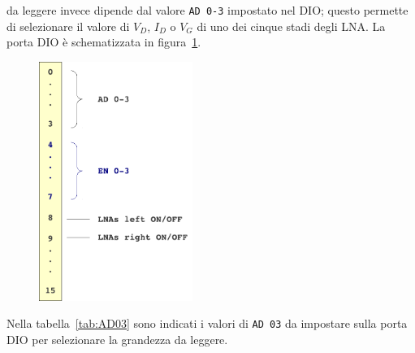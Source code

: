 da leggere invece dipende dal valore \texttt{AD 0-3} impostato nel DIO; questo permette di selezionare il valore di
$V_D$, $I_D$ o $V_G$ di uno dei cinque stadi degli LNA. La porta DIO \`e schematizzata in figura~\ref{fig:DIO}.
\begin{center}
\begin{figure}[!htbp]
        \begin{center}
        \includegraphics[width=5cm]{figure/DIO}
        \end{center}
         \label{fig:DIO}
\end{figure}
\end{center}
Nella tabella~\ref{tab:AD03} sono indicati i valori di \texttt{AD 03} da impostare sulla porta DIO
per selezionare la grandezza da leggere.
\renewcommand\arraystretch{1.2}
